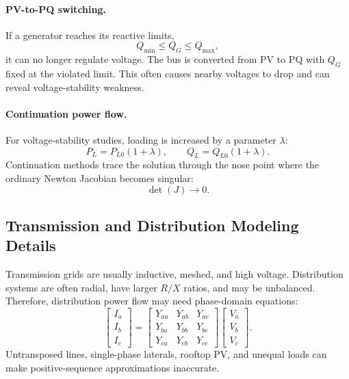\documentclass[11pt]{article}
\newcommand{\V}{\mathbf{V}}
\newcommand{\I}{\mathbf{I}}
\begin{document}
\paragraph{PV-to-PQ switching.}
If a generator reaches its reactive limits,
\begin{equation}
Q_{\min}\le Q_G\le Q_{\max},
\end{equation}
it can no longer regulate voltage. The bus is converted from PV to PQ with
$Q_G$ fixed at the violated limit. This often causes nearby voltages to drop and
can reveal voltage-stability weakness.

\paragraph{Continuation power flow.}
For voltage-stability studies, loading is increased by a parameter $\lambda$:
\begin{equation}
P_L=P_{L0}(1+\lambda), \qquad Q_L=Q_{L0}(1+\lambda).
\end{equation}
Continuation methods trace the solution through the nose point where the
ordinary Newton Jacobian becomes singular:
\begin{equation}
\det(J)\rightarrow 0.
\end{equation}

\subsection{Transmission and Distribution Modeling Details}
Transmission grids are usually inductive, meshed, and high voltage. Distribution
systems are often radial, have larger $R/X$ ratios, and may be unbalanced.
Therefore, distribution power flow may need phase-domain equations:
\begin{equation}
\begin{bmatrix}I_a\\I_b\\I_c\end{bmatrix}
=
\begin{bmatrix}
Y_{aa}&Y_{ab}&Y_{ac}\\
Y_{ba}&Y_{bb}&Y_{bc}\\
Y_{ca}&Y_{cb}&Y_{cc}
\end{bmatrix}
\begin{bmatrix}V_a\\V_b\\V_c\end{bmatrix}.
\end{equation}
Untransposed lines, single-phase laterals, rooftop PV, and unequal loads can
make positive-sequence approximations inaccurate.
\end{document}
